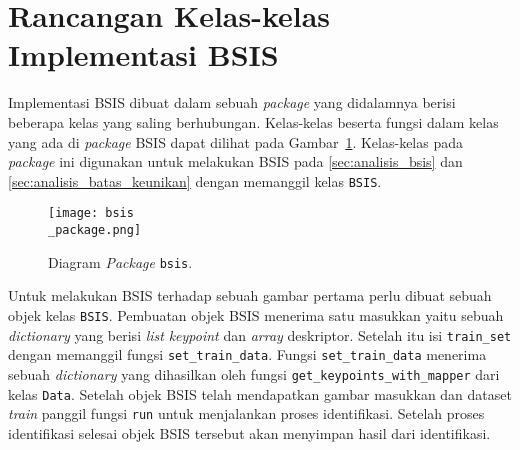 \section{Rancangan Kelas-kelas Implementasi BSIS}
Implementasi BSIS dibuat dalam sebuah \textit{package} yang didalamnya berisi beberapa kelas yang saling berhubungan. Kelas-kelas beserta fungsi dalam kelas yang ada di \textit{package} BSIS dapat dilihat pada Gambar~\ref{fig:bsis_package}. Kelas-kelas pada \textit{package} ini digunakan untuk melakukan BSIS pada \ref{sec:analisis_bsis} dan \ref{sec:analisis_batas_keunikan} dengan memanggil kelas \texttt{BSIS}.
\begin{figure}[H]
	\centering
	\texttt{[image: bsis\\\_package.png]}
	\caption{Diagram \textit{Package} \texttt{bsis}.}
	\label{fig:bsis_package}
\end{figure}
Untuk melakukan BSIS terhadap sebuah gambar pertama perlu dibuat sebuah objek kelas \texttt{BSIS}. Pembuatan objek BSIS menerima satu masukkan yaitu sebuah \textit{dictionary} yang berisi \textit{list} \textit{keypoint} dan \textit{array} deskriptor. Setelah itu isi \texttt{train\_set} dengan memanggil fungsi \texttt{set\_train\_data}. Fungsi \texttt{set\_train\_data} menerima sebuah \textit{dictionary} yang dihasilkan oleh fungsi \texttt{get\_keypoints\_with\_mapper} dari kelas \texttt{Data}. Setelah objek BSIS telah mendapatkan gambar masukkan dan dataset \textit{train} panggil fungsi \texttt{run} untuk menjalankan proses identifikasi. Setelah proses identifikasi selesai objek BSIS tersebut akan menyimpan hasil dari identifikasi.

